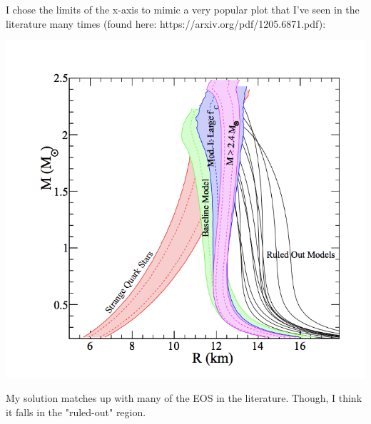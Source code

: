 \documentclass[12pt, letterpaper]{article}
\begin{document}
I chose the limits of the x-axis to mimic a very popular plot that I've seen in the literature many times (found here: https://arxiv.org/pdf/1205.6871.pdf):

\includegraphics{NS_lit.png}

My solution matches up with many of the EOS in the literature. Though, I think it falls in the "ruled-out" region. 
\end{document}
